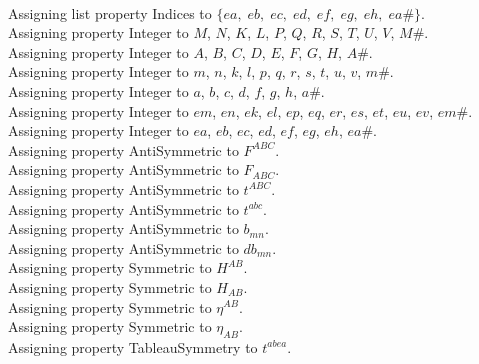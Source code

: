 \documentclass[11pt]{article}
\begin{document}
\\
Assigning list property Indices to $\{ea,\; eb,\; ec,\; ed,\; ef,\; eg,\; eh,\; ea\#\}$.
\\
Assigning property Integer to $M$, $N$, $K$, $L$, $P$, $Q$, $R$, $S$, $T$, $U$, $V$, $M\#$.
\\
Assigning property Integer to $A$, $B$, $C$, $D$, $E$, $F$, $G$, $H$, $A\#$.
\\
Assigning property Integer to $m$, $n$, $k$, $l$, $p$, $q$, $r$, $s$, $t$, $u$, $v$, $m\#$.
\\
Assigning property Integer to $a$, $b$, $c$, $d$, $f$, $g$, $h$, $a\#$.
\\
Assigning property Integer to $em$, $en$, $ek$, $el$, $ep$, $eq$, $er$, $es$, $et$, $eu$, $ev$, $em\#$.
\\
Assigning property Integer to $ea$, $eb$, $ec$, $ed$, $ef$, $eg$, $eh$, $ea\#$.
\\
Assigning property AntiSymmetric to ${F}^{A B C}$.
\\
Assigning property AntiSymmetric to ${F}_{A B C}$.
\\
Assigning property AntiSymmetric to ${t}^{A B C}$.
\\
Assigning property AntiSymmetric to ${t}^{a b c}$.
\\
Assigning property AntiSymmetric to ${b}_{m n}$.
\\
Assigning property AntiSymmetric to ${db}_{m n}$.
\\
Assigning property Symmetric to ${H}^{A B}$.
\\
Assigning property Symmetric to ${H}_{A B}$.
\\
Assigning property Symmetric to ${\eta}^{A B}$.
\\
Assigning property Symmetric to ${\eta}_{A B}$.
\\
Assigning property TableauSymmetry to ${t}^{a b ea}$.
\end{document}
